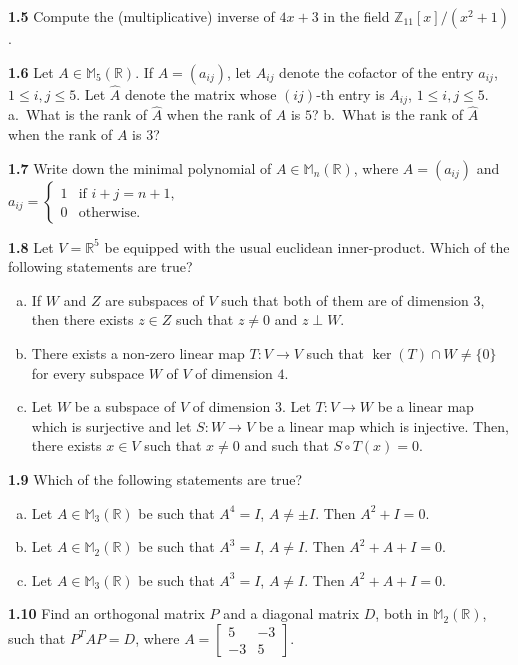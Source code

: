 \documentclass[11pt,a4paper]{article}
\newcommand{\Z}{\mathbb{Z}}
\newcommand{\R}{\mathbb{R}}
\newcommand{\M}{\mathbb{M}}
\newcommand{\qitem}[1]{\par\medskip\noindent\textbf{#1}\hspace{0.5em}}
\begin{document}
\qitem{1.5} Compute the (multiplicative) inverse of $4x + 3$ in the field $\Z_{11}[x]/(x^2 + 1)$.

\qitem{1.6} Let $A \in \M_5(\R)$. If $A = (a_{ij})$, let $A_{ij}$ denote the cofactor of the entry $a_{ij}$, $1 \le i, j \le 5$. Let $\widehat{A}$ denote the matrix whose $(ij)$-th entry is $A_{ij}$, $1 \le i, j \le 5$.\\
a.\ What is the rank of $\widehat{A}$ when the rank of $A$ is $5$? \qquad b.\ What is the rank of $\widehat{A}$ when the rank of $A$ is $3$?

\qitem{1.7} Write down the minimal polynomial of $A \in \M_n(\R)$, where $A = (a_{ij})$ and $a_{ij} = \begin{cases} 1 & \text{if } i + j = n + 1, \\ 0 & \text{otherwise.} \end{cases}$

\qitem{1.8} Let $V = \R^5$ be equipped with the usual euclidean inner-product. Which of the following statements are true?
\begin{enumerate}[a.]
  \item If $W$ and $Z$ are subspaces of $V$ such that both of them are of dimension $3$, then there exists $z \in Z$ such that $z \neq 0$ and $z \perp W$.
  \item There exists a non-zero linear map $T : V \to V$ such that $\ker(T) \cap W \neq \{0\}$ for every subspace $W$ of $V$ of dimension $4$.
  \item Let $W$ be a subspace of $V$ of dimension $3$. Let $T : V \to W$ be a linear map which is surjective and let $S : W \to V$ be a linear map which is injective. Then, there exists $x \in V$ such that $x \neq 0$ and such that $S \circ T(x) = 0$.
\end{enumerate}

\qitem{1.9} Which of the following statements are true?
\begin{enumerate}[a.]
  \item Let $A \in \M_3(\R)$ be such that $A^4 = I$, $A \neq \pm I$. Then $A^2 + I = 0$.
  \item Let $A \in \M_2(\R)$ be such that $A^3 = I$, $A \neq I$. Then $A^2 + A + I = 0$.
  \item Let $A \in \M_3(\R)$ be such that $A^3 = I$, $A \neq I$. Then $A^2 + A + I = 0$.
\end{enumerate}

\qitem{1.10} Find an orthogonal matrix $P$ and a diagonal matrix $D$, both in $\M_2(\R)$, such that $P^T A P = D$, where $A = \begin{bmatrix} 5 & -3 \\ -3 & 5 \end{bmatrix}$.
\end{document}
